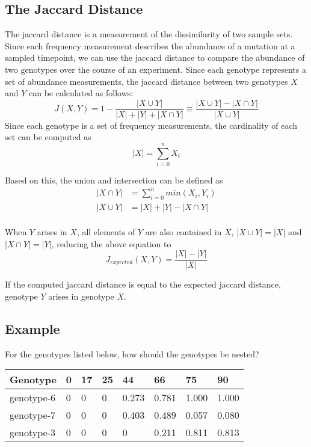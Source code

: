 \documentclass{book}
\begin{document}
\subsection{The Jaccard Distance}

The jaccard distance is a measurement of the dissimilarity of two sample sets. Since each frequency measurement describes the abundance of a mutation at a sampled timepoint, we can use the jaccard distance to compare the abundance of two genotypes over the course of an experiment.
Since each genotype represents a set of abundance measurements, the jaccard distance between two genotypes $X$ and $Y$ can be calculated as follows:
\begin{equation}
J(X,Y)=1 - \frac{|X\cup Y|}{|X|+|Y|+|X \cap Y|}\equiv \frac{|X\cup Y|-|X \cap Y|}{|X \cup Y|}
\end{equation}
Since each genotype is a set of frequency measurements, the cardinality of each set can be computed as
\begin{equation}
|X| = \sum_{i=0}^n X_i
\end{equation}


Based on this, the union and intersection can be defined as
\begin{align*}
|X \cap Y| &= \sum_{i=0}^n min(X_i,Y_i) \\
|X \cup Y| &= |X| + |Y| - |X \cap Y| \\
\end{align*}


When $Y$ arises in $X$, all elements of $Y$ are also contained in $X$, $|X \cup Y| = |X|$ and $|X \cap Y| = |Y|$, reducing the above equation to
\begin{equation}
J_{expected}(X,Y) = \frac{|X|-|Y|}{|X|}
\end{equation}


If the computed jaccard distance is equal to the expected jaccard distance, genotype $Y$ arises in genotype $X$.

\subsection{Example}

  For the genotypes listed below, how should the genotypes be nested?

\begin{tabular}{l|lllllll}
  Genotype & 0 & 17 & 25 & 44 & 66 & 75 & 90 \\
  \hline
 genotype-6 & 0 & 0  & 0  & 0.273 & 0.781 & 1.000 & 1.000 \\
 genotype-7 & 0 & 0  & 0  & 0.403 & 0.489 & 0.057 & 0.080 \\
 genotype-3 & 0 & 0  & 0  & 0     & 0.211 & 0.811 & 0.813 \\
\end{tabular}
\end{document}
